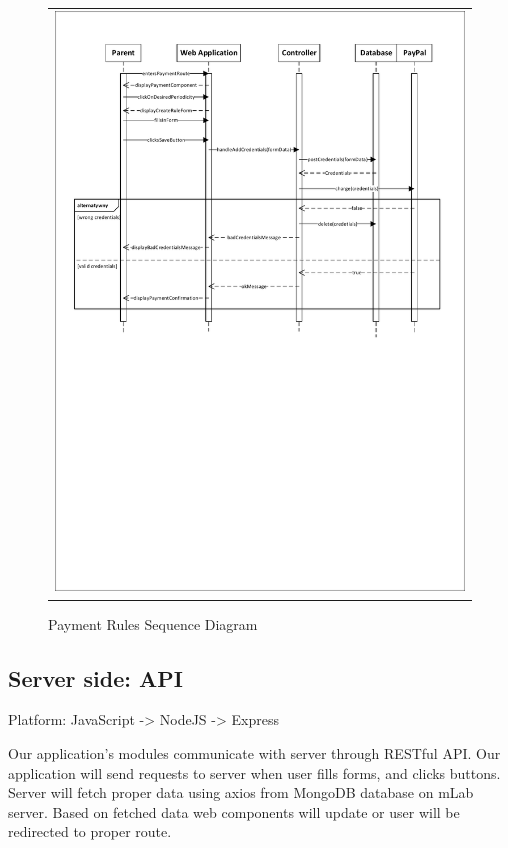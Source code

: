 \documentclass{sprawozdanie-agh}
\begin{document}
			\begin{figure}[H] 
				\centering
				\begin{tabular}{c}
					\includegraphics[width=.85\textwidth]{paymentSequenceDiagram}
				\end{tabular} 
				\caption{Payment Rules Sequence Diagram}
			\end{figure}
		
		\subsection{Server side: API}

			Platform: JavaScript -> NodeJS -> Express

			Our application's modules communicate with server through RESTful API. Our application will send requests to server when user fills forms, and clicks buttons. Server will fetch proper data using axios from MongoDB database on mLab server. Based on fetched data web components will update or user will be redirected to proper route.
			
\end{document}
